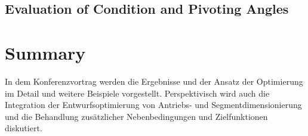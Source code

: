 \documentclass[fleqn,a4paper,10pt]{article}
\begin{document}
\begin{multicols}{2}
\subsection{Evaluation of Condition and Pivoting Angles}





\section{Summary}
\label{sec:summary}

In dem Konferenzvortrag werden die Ergebnisse und der Ansatz der Optimierung im Detail und weitere Beispiele vorgestellt.
Perspektivisch wird auch die Integration der Entwurfsoptimierung von Antriebs- und Segmentdimensionierung und die Behandlung zusätzlicher Nebenbedingungen und Zielfunktionen diskutiert.


\end{multicols}
\end{document}
